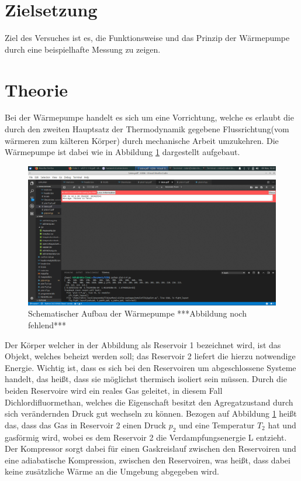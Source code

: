 \section{Zielsetzung}
Ziel des Versuches ist es, die Funktionsweise und das Prinzip der Wärmepumpe durch eine beispielhafte Messung zu zeigen.

\section{Theorie}
\label{sec:Theorie}
Bei der Wärmepumpe handelt es sich um eine Vorrichtung, welche es erlaubt die durch den zweiten Hauptsatz der Thermodynamik gegebene Flussrichtung(vom wärmeren zum kälteren Körper) durch
mechanische Arbeit umzukehren. Die Wärmepumpe ist dabei wie in Abbildung \ref{fig:skizze} dargestellt aufgebaut.
\begin{figure}
  \centering
  \includegraphics{content/skizze.png}
  \caption{Schematischer Aufbau der Wärmepumpe ***Abbildung noch fehlend*** \cite[193]{206}}
  \label{fig:skizze}
\end{figure}
Der Körper welcher in der Abbildung als Reservoir 1 bezeichnet wird, ist das Objekt, welches beheizt werden soll; das Reservoir 2 liefert die hierzu notwendige Energie.
Wichtig ist, dass es sich bei den Reservoiren um abgeschlossene Systeme handelt, das heißt, dass sie möglichst thermisch isoliert sein müssen.
Durch die beiden Reservoire wird ein reales Gas geleitet, in diesem Fall Dichlordifluormethan, welches die Eigenschaft besitzt den Agregatzustand durch sich verändernden Druck gut wechseln zu können.
Bezogen auf Abbildung \ref{fig:skizze} heißt das, dass das Gas in Reservoir 2 einen Druck $p_2$ und eine Temperatur $T_2$ hat und gasförmig wird, wobei es dem Reservoir 2 die Verdampfungsenergie L entzieht. 
Der Kompressor sorgt dabei für einen Gaskreislauf zwischen den Reservoiren und eine adiabatische Kompression, zwischen den Reservoiren, was heißt, dass dabei keine zusätzliche Wärme an die Umgebung abgegeben wird.
